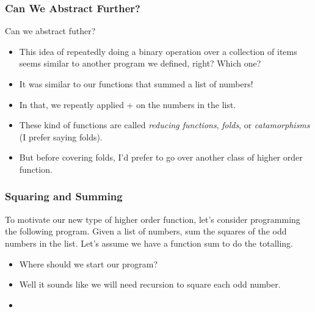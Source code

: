 \documentclass{beamer}
\begin{document}
\begin{frame}
  \frametitle{Can We Abstract Further?}
  Can we abstract futher?
  \begin{itemize}
  \item<2-> This idea of repeatedly doing a binary operation over
    a collection of items seems similar to another program we defined,
    right? Which one?
  \item<3->  It was similar to our functions that summed a list of numbers!
  \item<4-> In that, we repeatly applied + on the numbers in the list.
  \item<5-> These kind of functions are called \emph{reducing functions},
    \emph{folds}, or \emph{catamorphisms} (I prefer saying folds).
  \item<6-> But before covering folds, I'd prefer to go over another
    class of higher order function.
  \end{itemize}
\end{frame}


\begin{frame}
  \frametitle{Squaring and Summing}
  To motivate our new type of higher order function, let's consider
  programming the following program. Given a list of numbers, sum the squares
  of the odd numbers in the list. Let's assume we have a function sum to
  do the totalling.
  \begin{itemize}
  \item<2-> Where should we start our program?
  \item<3-> Well it sounds like we will need recursion to square each odd number.
  \item<4->\complexSkeleton  
  \end{itemize}
\end{frame}

\end{document}
